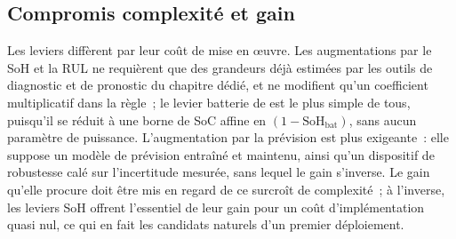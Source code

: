 \subsection{Compromis complexité et gain}

Les leviers diffèrent par leur coût de mise en œuvre. Les augmentations par le SoH et la RUL ne requièrent que des grandeurs déjà estimées par les outils de diagnostic et de pronostic du chapitre dédié, et ne modifient qu'un coefficient multiplicatif dans la règle~; le levier batterie de \RBsohB{} est le plus simple de tous, puisqu'il se réduit à une borne de SoC affine en $(1-\text{SoH}_{\text{bat}})$, sans aucun paramètre de puissance. L'augmentation par la prévision est plus exigeante~: elle suppose un modèle de prévision entraîné et maintenu, ainsi qu'un dispositif de robustesse calé sur l'incertitude mesurée, sans lequel le gain s'inverse. Le gain qu'elle procure doit être mis en regard de ce surcroît de complexité~; à l'inverse, les leviers SoH offrent l'essentiel de leur gain pour un coût d'implémentation quasi nul, ce qui en fait les candidats naturels d'un premier déploiement.
